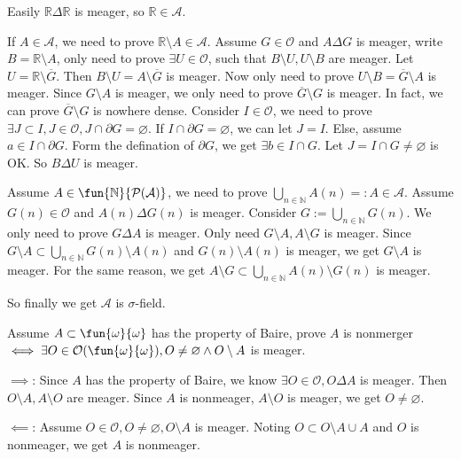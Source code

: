 \documentclass{ctexart}
\begin{document}
\begin{solution}
  Easily \(\mathbb{R} \Delta \mathbb{R}\) is meager, so \(\mathbb{R} \in \mathcal{A}\). 

  If \(A \in \mathcal{A}\), we need to prove \(\mathbb{R} \setminus A \in \mathcal{A}\). 
  Assume \(G \in \mathcal{O}\) and \( A \Delta G\) is meager, write \(B=\mathbb{R}\setminus A\), 
  only need to prove \(\exists U \in \mathcal{O}\), such that \(B\setminus U,U\setminus B\) are meager. 
  Let \(U=\mathbb{R} \setminus \overline{G}\). Then \(B \setminus U = A \setminus \overline{G}\) is meager. 
  Now only need to prove \(U \setminus B = \overline{ G}\setminus A\) is meager. 
  Since \(G \setminus A\) is meager, we only need to prove \(\overline{G}\setminus G\) is meager. 
  In fact, we can prove \(\overline{G}\setminus G\) is nowhere dense. 
  Consider \(I \in \mathcal{O}\), we need to prove \(\exists J \subset I,J \in \mathcal{O}, J \cap \partial G = \varnothing\). 
  If \(I \cap \partial G = \varnothing\), we can let \(J = I\). 
  Else, assume \( a \in I \cap \partial G\). Form the defination of \(\partial G\), 
  we get \(\exists b \in I \cap G\). Let \(J = I \cap G \neq \varnothing\) is OK. 
  So \(B \Delta U\) is meager. 

  Assume \(A \in \fun{\mathbb{N}}{\mathcal{P}(\mathcal{A})}\), we need to prove \(\bigcup_{n \in \mathbb{N}} A(n)=:A \in \mathcal{A}\). 
  Assume \(G(n) \in \mathcal{O}\) and \(A(n) \Delta G(n)\) is meager. Consider \(G:= \bigcup_{ n \in \mathbb{N}} G(n)\). 
  We only need to prove \(G \Delta A\) is meager. Only need \(G \setminus A,A \setminus G\) is meager. 
  Since \(G \setminus A \subset \bigcup_{n \in \mathbb{N}} G(n) \setminus A(n)\) and \(G(n)\setminus A(n)\) is meager, we get \(G \setminus A\) is meager. 
  For the same reason, we get \(A \setminus G \subset \bigcup_{n \in \mathbb{N}} A(n)\setminus G(n)\) is meager. 

  So finally we get \(\mathcal{A}\) is \(\sigma\)-field. 
\end{solution}

\begin{problem}
  Assume \(A \subset \fun{\omega}{\omega}\) has the property of Baire, prove \(A\) is nonmerger \(\iff \exists O \in \mathcal{O}(\fun{\omega}{\omega}),O \neq \varnothing \wedge O\setminus A\) is meager. 
\end{problem}

\begin{solution}
  \(\implies\): Since \(A\) has the property of Baire, we know \(\exists O \in \mathcal{O},O \Delta A\) is meager. 
  Then \(O \setminus A,A \setminus O\) are meager. Since \(A\) is nonmeager, \(A \setminus O\) is meager, we get \(O \neq \varnothing\). 

  \(\impliedby\): Assume \(O \in \mathcal{O}, O \neq \varnothing, O \setminus A\) is meager. 
 Noting \(O \subset O \setminus A \cup A\) and \(O\) is nonmeager, we get \(A\) is nonmeager. 
\end{solution}
\end{document}
